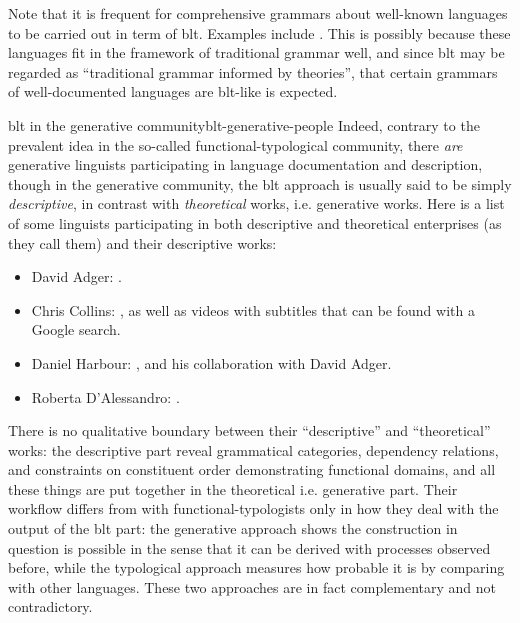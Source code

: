 \documentclass[UTF8, a4paper, oneside, scheme=plain]{ctexart}
\begin{document}
Note that it is frequent 
for comprehensive grammars about well-known languages to be carried out in term of \ac{blt}.
Examples include \cite{batchelor2010reference,batchelor2011reference}.
This is possibly because these languages fit in the framework of traditional grammar well,
and since \ac{blt} may be regarded as ``traditional grammar informed by theories'',
that certain grammars of well-documented languages are \ac{blt}-like is expected.

\begin{infobox}{\ac{blt} in the generative community}{blt-generative-people}
    Indeed, contrary to the prevalent idea in the so-called functional-typological community,
    there \emph{are} generative linguists participating in language documentation and description,
    though in the generative community, 
    the \ac{blt} approach is usually said to be simply \emph{descriptive},
    in contrast with \emph{theoretical} works, i.e. generative works.
    Here is a list of some linguists participating in 
    both descriptive and theoretical enterprises (as they call them)
    and their descriptive works:
    \begin{itemize}
        \item David Adger: \citet{adger1997vso,adger2006dialect,harbour2012information}.
        \item Chris Collins: \citet{collins2014plural,miller2007sounds}, 
        as well as videos with subtitles that can be found with a Google search.
        \item Daniel Harbour: \citet{watkins2010linguistic}, and his collaboration with David Adger.
        \item Roberta D'Alessandro: \citet{andriani2022documenting,frasson2021subject}.
    \end{itemize}
    There is no qualitative boundary between their ``descriptive'' and ``theoretical'' works:
    the descriptive part reveal grammatical categories, dependency relations,
    and constraints on constituent order demonstrating functional domains,
    and all these things are put together in the theoretical i.e. generative part.
    Their workflow differs from with functional-typologists only in 
    how they deal with the output of the \ac{blt} part:
    the generative approach shows the construction in question is possible 
    in the sense that it can be derived with processes observed before,
    while the typological approach measures how probable it is 
    by comparing with other languages.
    These two approaches are in fact complementary and not contradictory.
\end{infobox}
\end{document}
